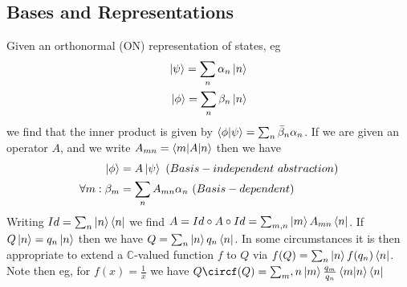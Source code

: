 \documentclass{article}
\begin{document}
\subsection{Bases and Representations}
Given an orthonormal (ON) representation of states, eg
\begin{align*}
  \ket\psi=\sum_n\alpha_n\ket n
  \\
  \ket\phi=\sum_n\beta_n\ket n
\end{align*}
we find that the inner product is given by $\braket{\phi|\psi}=\sum_n\bar\beta_n\alpha_n$.  If we are given an operator $A$, and we write $A_{mn}=\braket{m|A|n}$ then we have
\begin{align*}
  \ket \phi&=A\ket\psi~(Basis-independent~abstraction)
  \\
  \forall m :\beta_m&=\sum_nA_{mn}\alpha_n~(Basis-dependent)
\end{align*}
Writing $Id=\sum_n\ket n\bra n$ we find $A=Id\circ A\circ Id=\sum_{m,n}\ket mA_{mn}\bra{n}$.  If $Q\ket n =q_n \ket n$ then we have $Q=\sum_n \ket n q_n \bra n$.  In some circumstances it is then appropriate to extend a $\mathbb C $-valued function $f$ to $Q$ via $f(Q)=\sum_n \ket n f(q_n) \bra n$.  Note then eg, for $f(x)=\frac{1}{x}$ we have $Q\circf(Q)=\sum_m,n\ket m \frac{q_m}{q_n}\braket{m|n}\bra n$
\end{document}

